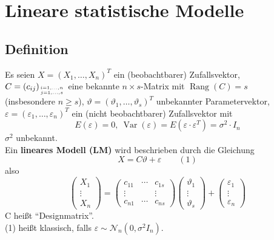 \documentclass[a4paper,11pt,twoside,titlepage]{article}
\newcommand\NN{ \mathcal{N} } %
\DeclareMathOperator{\var}{Var}
\begin{document}
\cleardoublepage
\section{Lineare statistische Modelle}
\subsection{Definition}
Es seien $X=(X_1,\ldots,X_n)^T$ ein (beobachtbarer) Zufallsvektor,\\ $C=(c_{ij})_{{i=1,\ldots,n}\atop{j=1,\ldots,s}}$ eine bekannte $n\times s$-Matrix mit $\operatorname{Rang}(C)=s$\\ (insbesondere $n\geq s$), $\vartheta=(\vartheta_1,\ldots,\vartheta_s)^T$ unbekannter Parametervektor,\\ $\varepsilon=(\varepsilon_1,\ldots,\varepsilon_n)^T$ ein (nicht beobachtbarer) Zufallsvektor mit \[E(\varepsilon)=0,\  \var(\varepsilon)=E(\varepsilon\cdot\varepsilon^T)=\sigma^2\cdot I_n\] $\sigma^2$ unbekannt.\\
Ein \textbf{lineares Modell (LM)} wird beschrieben durch die Gleichung
\[X=C\vartheta+\varepsilon\qquad(1)\]
also
\[\begin{pmatrix} X_1\\\vdots\\X_n\end{pmatrix}=\begin{pmatrix}c_{11}&\cdots&c_{1s}\\\vdots&&\vdots\\c_{n1}&\cdots&c_{ns}\end{pmatrix}\begin{pmatrix} \vartheta_1\\\vdots\\\vartheta_s\end{pmatrix}+\begin{pmatrix}\varepsilon_1\\\vdots\\\varepsilon_n\end{pmatrix}\]
C heißt "`Designmatrix"'.\\
(1) heißt klassisch, falls $\varepsilon\sim\NN_n(0,\sigma^2I_n)$.
\end{document}
